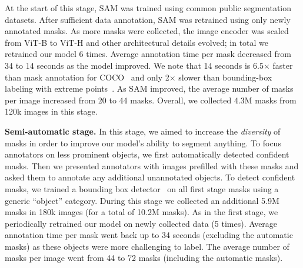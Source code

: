 \documentclass[10pt,twocolumn,letterpaper]{article}
\renewcommand{\paragraph}[1]{\vspace{1.25mm}\noindent\textbf{#1}}
\newcommand{\x}{{\times}}
\newcommand{\sam}{SAM\xspace}
\begin{document}
At the start of this stage, \sam was trained using common public segmentation datasets. After sufficient data annotation, \sam was retrained using only newly annotated masks. As more masks were collected, the image encoder was scaled from ViT-B to ViT-H and other architectural details evolved; in total we retrained our model 6 times. Average annotation time per mask decreased from 34 to 14 seconds as the model improved. We note that 14 seconds is 6.5$\x$ faster than mask annotation for COCO~\cite{Lin2014} and only 2$\x$ slower than bounding-box labeling with extreme points~\cite{papadopoulos2017extreme,maninis2018deep}. As \sam improved, the average number of masks per image increased from 20 to 44 masks. Overall, we collected 4.3M masks from 120k images in this stage.

\paragraph{Semi-automatic stage.} In this stage, we aimed to increase the \emph{diversity} of masks in order to improve our model's ability to segment anything. To focus annotators on less prominent objects, we first automatically detected confident masks. Then we presented annotators with images prefilled with these masks and asked them to annotate any additional unannotated objects. To detect confident masks, we trained a bounding box detector~\cite{Ren2015} on all first stage masks using a generic ``object'' category. During this stage we collected an additional 5.9M masks in 180k images (for a total of 10.2M masks). As in the first stage, we periodically retrained our model on newly collected data (5 times). Average annotation time per mask went back up to 34 seconds (excluding the automatic masks) as these objects were more challenging to label. The average number of masks per image went from 44 to 72 masks (including the automatic masks).
\end{document}
